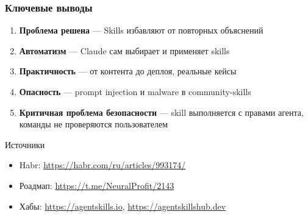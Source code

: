 \documentclass[aspectratio=169]{beamer}
\begin{document}
\begin{frame}
\frametitle{Ключевые выводы}

\begin{enumerate}
    \item \textbf{Проблема решена} — Skills избавляют от повторных объяснений
    
    \item \textbf{Автоматизм} — Claude сам выбирает и применяет skills
    
    \item \textbf{Практичность} — от контента до деплоя, реальные кейсы
    
    \item \textbf{Опасность} — prompt injection и malware в community-skills
    
    \item \textbf{Критичная проблема безопасности} — skill выполняется с правами агента, команды не проверяются пользователем
\end{enumerate}

\vspace{0.5cm}

\begin{block}{Источники}
\begin{itemize}
    \item Habr: \url{https://habr.com/ru/articles/993174/}
    \item Роадмап: \url{https://t.me/NeuralProfit/2143}
    \item Хабы: \url{https://agentskills.io}, \url{https://agentskillshub.dev}
\end{itemize}
\end{block}

\end{frame}
\end{document}
